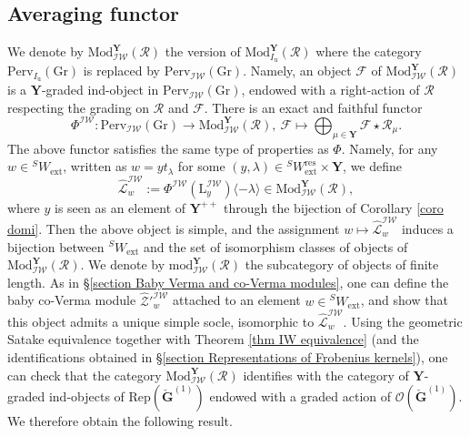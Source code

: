 \documentclass[11pt]{amsart}
\theoremstyle{plain}
\theoremstyle{remark}
\numberwithin{equation}{section}
\begin{document}
 \subsection{Averaging functor}
 We denote by $\mathrm{Mod}^\mathbf{Y}_{\mathcal{IW}}(\mathcal{R})$ the version of $\mathrm{Mod}^\mathbf{Y}_{I_\mathrm{u}}(\mathcal{R})$ where the category $\mathrm{Perv}_{I_\mathrm{u}}(\mathrm{Gr})$ is replaced by $\mathrm{Perv}_{\mathcal{IW}}(\mathrm{Gr})$. Namely, an object $\mathcal{F}$ of $\mathrm{Mod}^\mathbf{Y}_{\mathcal{IW}}(\mathcal{R})$ is a $\mathbf{Y}$-graded ind-object in $\mathrm{Perv}_{\mathcal{IW}}(\mathrm{Gr})$, endowed with a right-action of $\mathcal{R}$ respecting the grading on $\mathcal{R}$ and $\mathcal{F}$. There is an exact and faithful functor 
 $$\Phi^\mathcal{IW}:\mathrm{Perv}_{\mathcal{IW}}(\mathrm{Gr})\to \mathrm{Mod}^\mathbf{Y}_{\mathcal{IW}}(\mathcal{R}),~\mathcal{F}\mapsto\bigoplus_{\mu\in\mathbf{Y}}\mathcal{F}\star\mathcal{R}_\mu. $$
The above functor satisfies the same type of properties as $\Phi$. Namely, for any $w\in {^SW_\mathrm{ext}}$, written as $w=yt_\lambda$ for some $(y,\lambda)\in {^SW_\mathrm{ext}^\mathrm{res}}\times\mathbf{Y}$, we define 
$$\widehat{\mathcal{L}}_w^{\mathcal{IW}}:=\Phi^\mathcal{IW}(\mathrm{L}^\mathcal{IW}_y)\langle-\lambda\rangle\in \mathrm{Mod}^\mathbf{Y}_{\mathcal{IW}}(\mathcal{R}),$$
where $y$ is seen as an element of $\mathbf{Y}^{++}$ through the bijection of Corollary \ref{coro domi}. Then the above object is simple, and the assignment  $w\mapsto \widehat{\mathcal{L}}_{w}^\mathcal{IW}$ induces a bijection between $^SW_{\mathrm{ext}}$ and the set of isomorphism classes of objects of $\mathrm{Mod}^\mathbf{Y}_{\mathcal{IW}}(\mathcal{R})$. We denote by $\mathrm{mod}^\mathbf{Y}_{\mathcal{IW}}(\mathcal{R})$ the subcategory of objects of finite length. As in §\ref{section Baby Verma and co-Verma modules}, one can define the baby co-Verma module $\widehat{\mathcal{Z}}'^{\mathcal{IW}}_w$ attached to an element $w\in {^SW_{\mathrm{ext}}}$, and show that this object admits a unique simple socle, isomorphic to $\widehat{\mathcal{L}}_{w}^\mathcal{IW}$. Using the geometric Satake equivalence together with Theorem \ref{thm IW equivalence} (and the identifications obtained in §\ref{section Representations of Frobenius kernels}), one can check that the category $\mathrm{Mod}^\mathbf{Y}_{\mathcal{IW}}(\mathcal{R})$ identifies with the category of $\mathbf{Y}$-graded ind-objects of $\mathrm{Rep}(\check{\mathbf{G}}^{(1)})$ endowed with a graded action of $\mathcal{O}(\check{\mathbf{G}}^{(1)})$. We therefore obtain the following result.
\end{document}
